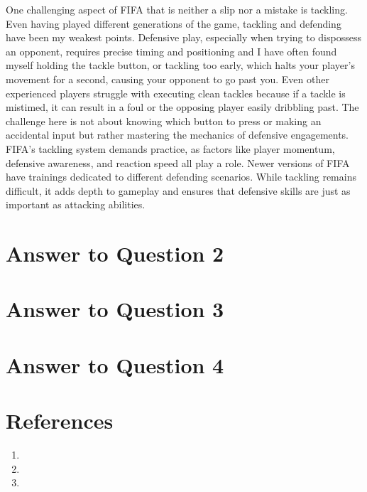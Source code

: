 \documentclass[
	letterpaper, %
]{jdf}
\begin{document}
One challenging aspect of FIFA that is neither a slip nor a mistake is tackling. Even having played different generations of the game, tackling and defending have been my weakest points. Defensive play, especially when trying to dispossess an opponent, requires precise timing and positioning and I have often found myself holding the tackle button, or tackling too early, which halts your player's movement for a second, causing your opponent to go past you. Even other experienced players struggle with executing clean tackles because if a tackle is mistimed, it can result in a foul or the opposing player easily dribbling past. The challenge here is not about knowing which button to press or making an accidental input but rather mastering the mechanics of defensive engagements. FIFA’s tackling system demands practice, as factors like player momentum, defensive awareness, and reaction speed all play a role. Newer versions of FIFA have trainings dedicated to different defending scenarios. While tackling remains difficult, it adds depth to gameplay and ensures that defensive skills are just as important as attacking abilities.
\newpage

\section{Answer to Question 2}
 
\newpage

\section{Answer to Question 3}
\subsection {}

\newpage

\section{Answer to Question 4}


\newpage

\section{References}

\printbibliography[heading=none]
\begin{enumerate}
    \item 
    \item 
    \item 

\end{enumerate}
\end{document}
